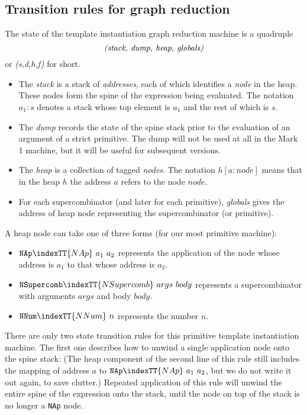 \subsection{Transition rules for graph reduction}
\label{sect:templ:transition-rules}

The state of the template instantiation graph reduction machine
is a quadruple
\[
\mbox{\em (stack, dump, heap, globals)}
\]
or {\em(s,d,h,f)\/} for short.
\begin{itemize}
\item
The {\em stack\/} is a stack of {\em addresses}, each of which
identifies a {\em node\/} in the heap.
These nodes form the spine of the expression being
evaluated.
The notation $a_1:s$ denotes a stack whose top
element is $a_1$ and the rest of which is $s$.
\item
The {\em dump\/} records the state of the spine stack
prior to
the evaluation of an argument of a strict primitive.
The dump will not be used at all in the Mark 1 machine, but it will
be useful for subsequent versions.
\item
The {\em heap\/} is a collection of tagged {\em nodes}.
The notation $h[a:node]$ means that
in the heap $h$
the address $a$ refers to the node $node$.
\item
For each supercombinator (and later for each primitive),
{\em globals\/}
gives the address of heap node representing the supercombinator
(or primitive).
\end{itemize}

A heap node can take one of three forms (for our most primitive machine):
\begin{itemize}
\item
$\mbox{\tt NAp}\indexTT{NAp}~a_1~a_2$ represents
the application of the node whose address is $a_1$ to that
whose address is $a_2$.
\item
$\mbox{\tt NSupercomb}\indexTT{NSupercomb}~args~body$ represents a supercombinator
with arguments $args$ and body $body$.
\item
$\mbox{\tt NNum}\indexTT{NNum}~n$ represents the number $n$.
\end{itemize}

There are only two state transition rules for this primitive
template instantiation machine.  The first one describes how to
unwind
a single application node onto the spine stack:
\label{rule:unwind}
(The heap component of the second line of this rule still includes the
mapping of address $a$ to $\mbox{\tt NAp}\indexTT{NAp}~a_1~a_2$, but we do not write it out
again, to save clutter.)
Repeated application of this rule will unwind the entire spine of
the expression onto the stack, until the node on top of the stack
is no longer a \mbox{\tt NAp} node.

